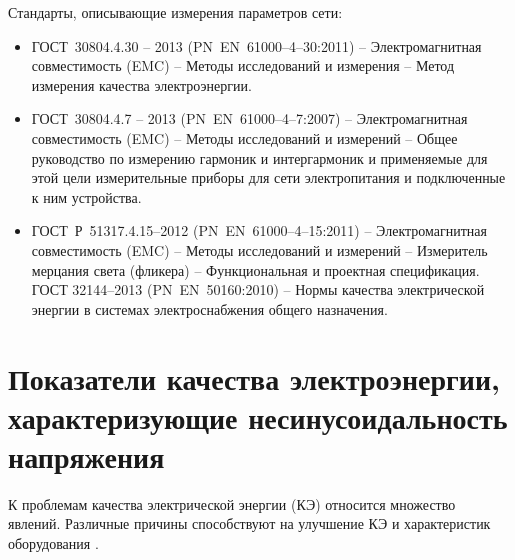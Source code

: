 Стандарты, описывающие измерения параметров сети:
\begin{itemize}
	\item ГОСТ~30804.4.30 -- 2013 (PN~EN~61000--4--30:2011) -- Электромагнитная совместимость (EMC) -- Методы исследований и измерения – Метод измерения качества электроэнергии.
	\item ГОСТ~30804.4.7 -- 2013 (PN~EN~61000--4--7:2007) -- Электромагнитная совместимость (EMC) -- Методы исследований и измерений -- Общее руководство по измерению гармоник и интергармоник и применяемые для этой цели измерительные приборы для сети электропитания и подключенные к ним устройства. 
	\item ГОСТ~Р~51317.4.15--2012 (PN~EN~61000--4--15:2011) -- Электромагнитная совместимость (EMC) -- Методы исследований и измерений -- Измеритель мерцания света (фликера) -- Функциональная и проектная спецификация.
	ГОСТ 32144--2013 (PN~EN~50160:2010) -- Нормы качества электрической энергии в системах электроснабжения общего назначения.
\end{itemize}

\section{Показатели качества электроэнергии, характеризующие несинусоидальность напряжения} \label{sec:ch4/sect2} 

К проблемам качества электрической энергии (КЭ) относится множество явлений. Различные причины способствуют на улучшение КЭ и характеристик оборудования \cite{GOST13109-97}.

